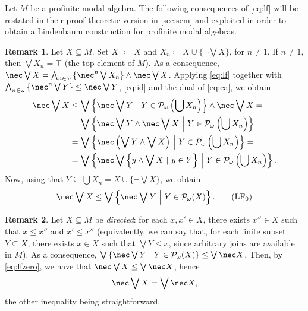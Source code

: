 \documentclass{article}
\theoremstyle{definition}
\newtheorem{rem}{Remark}
\begin{document}
Let $M$ be a profinite modal algebra. The following consequences of \cref{eq:lf} will be restated in their proof theoretic version in \cref{sec:sem} and exploited in order to obtain a Lindenbaum construction for profinite modal algebras.
\begin{rem}\label{rem:1}
Let $X \subseteq M$. Set $X_1 \coloneqq X$ and $X_n \coloneqq X \cup \{\neg \bigvee X\}$, for $n \neq 1$. If $n \neq 1$, then $\bigvee X_n = \top$ (the top element of $M$). 
As a consequence, $\nec \bigvee X = \bigwedge_{n\in \omega} \left\{\nec^n \bigvee X_n\right\} \wedge \nec \bigvee X$. Applying \cref{eq:lf} together with $\bigwedge_{n\in \omega} \left\{ \nec^n \bigvee Y\right\} \leq \nec \bigvee Y$, \cref{eq:id} and the dual of \cref{eq:ca}, we obtain
\begin{align*}
\nec \bigvee X &\leq \bigvee \left\{ \nec \bigvee Y\ \middle\vert\ Y \in \mathcal{P}_\omega\left(\bigcup X_n\right) \right\} \wedge \nec \bigvee X =\\
&= \bigvee \left\{ \nec \bigvee Y \wedge \nec \bigvee X\ \middle\vert\ Y \in \mathcal{P}_\omega\left(\bigcup X_n\right) \right\} =\\
&= \bigvee \left\{ \nec \left(\bigvee Y \wedge \bigvee X\right)\ \middle\vert\ Y \in \mathcal{P}_\omega\left(\bigcup X_n\right) \right\} =\\
&= \bigvee \left\{ \nec \bigvee \left\{y \wedge \bigvee X\ \vert\ y \in Y\right\}\ \middle\vert\ Y \in \mathcal{P}_\omega\left(\bigcup X_n\right) \right\}.
\end{align*}
Now, using that $Y \subseteq \bigcup X_n = X \cup \{\neg \bigvee X\}$, we obtain
\begin{align*}\label{eq:lfzero}
\nec \bigvee X \leq \bigvee \left\{ \nec \bigvee Y\ \middle\vert\ Y \in \mathcal{P}_\omega(X) \right\}.\tag{$\text{LF}_0$}
\end{align*}
\end{rem}

\begin{rem}
Let $X \subseteq M$ be \textit{directed}: for each $x, x' \in X$, there exists $x'' \in X$ such that $x \leq x''$ and $x' \leq x''$ (equivalently, we can say that, for each finite subset $Y \subseteq X$, there exists $x \in X$ such that $\bigvee Y \leq x$, since arbitrary joins are available in $M$). As a consequence, $\bigvee \left\{ \nec \bigvee Y\ \middle\vert\ Y \in \mathcal{P}_\omega(X) \right\} \leq \bigvee \nec X$. Then, by \cref{eq:lfzero}, we have that $\nec \bigvee X \leq \bigvee \nec X$, hence
$$\nec \bigvee X = \bigvee \nec X,$$
the other inequality being straightforward.
\end{rem}
\end{document}

